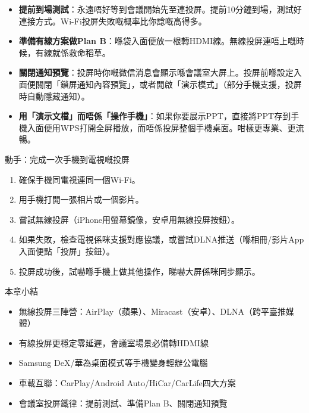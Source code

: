 \begin{itemize}
  \item \textbf{提前到場測試}：永遠唔好等到會議開始先至連投屏。提前10分鐘到場，測試好連接方式。Wi-Fi投屏失敗嘅概率比你諗嘅高得多。
  \item \textbf{準備有線方案做Plan B}：喺袋入面便放一根轉HDMI線。無線投屏連唔上嘅時候，有線就係救命稻草。
  \item \textbf{關閉通知預覽}：投屏時你嘅微信消息會顯示喺會議室大屏上。投屏前喺設定入面便關閉「鎖屏通知內容預覽」，或者開啟「演示模式」（部分手機支援，投屏時自動隱藏通知）。
  \item \textbf{用「演示文檔」而唔係「操作手機」}：如果你要展示PPT，直接將PPT存到手機入面便用WPS打開全屏播放，而唔係投屏整個手機桌面。咁樣更專業、更流暢。
\end{itemize}

\begin{tcbpractice}{動手：完成一次手機到電視嘅投屏}
\begin{enumerate}
  \item 確保手機同電視連同一個Wi-Fi。
  \item 用手機打開一張相片或一個影片。
  \item 嘗試無線投屏（iPhone用螢幕鏡像，安卓用無線投屏按鈕）。
  \item 如果失敗，檢查電視係咪支援對應協議，或嘗試DLNA推送（喺相冊/影片App入面便點「投屏」按鈕）。
  \item 投屏成功後，試嚇喺手機上做其他操作，睇嚇大屏係咪同步顯示。
\end{enumerate}

\end{tcbpractice}

\begin{tcbsummary}{本章小結}
\begin{itemize}
  \item 無線投屏三陣營：AirPlay（蘋果）、Miracast（安卓）、DLNA（跨平臺推媒體）
  \item 有線投屏更穩定零延遲，會議室場景必備轉HDMI線
  \item Samsung DeX/華為桌面模式等手機變身輕辦公電腦
  \item 車載互聯：CarPlay/Android Auto/HiCar/CarLife四大方案
  \item 會議室投屏鐵律：提前測試、準備Plan B、關閉通知預覽
\end{itemize}

\end{tcbsummary}
